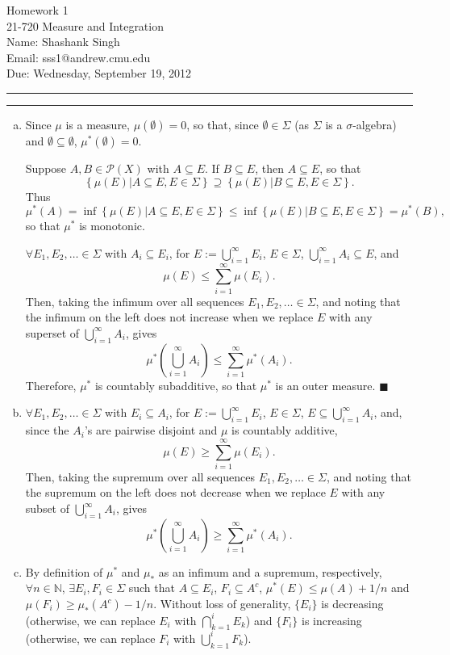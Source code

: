 \documentclass[11pt]{article}
\makeatletter
\newcounter{questionCounter}
\newcounter{partCounter}[questionCounter]
\newenvironment{question}[2][\arabic{questionCounter}]{%
    \setcounter{partCounter}{0}%
    \vspace{.25in} \hrule \vspace{0.5em}%
        \noindent{\bf #2}%
    \vspace{0.8em} \hrule \vspace{.10in}%
    \addtocounter{questionCounter}{1}%
}{}
\newcommand{\myname}{Shashank Singh}
\newcommand{\myandrew}{sss1@andrew.cmu.edu}
\newcommand{\myclass}{21-720 Measure and Integration}
\newcommand{\myhwnum}{1}
\newcommand{\duedate}{Wednesday, September 19, 2012}
\renewcommand{\qed}{\quad $\blacksquare$}
\newcommand{\N}{\mathbb{N}} %
\newcommand{\pow}[1]{\mathcal{P}\left(#1\right)} %
\makeatother
\begin{document}
\thispagestyle{plain}

{\Large Homework \myhwnum} \\
\myclass \\
Name: \myname \\
Email: \myandrew \\
Due: \duedate \\
\begin{question}{Problem 1}
\begin{enumerate}[(a)]
\item Since $\mu$ is a measure, $\mu(\emptyset) = 0$, so that, since
$\emptyset \in \Sigma$ (as $\Sigma$ is a $\sigma$-algebra) and
$\emptyset \subseteq \emptyset$, $\mu^*(\emptyset) = 0$.

Suppose $A,B \in \pow{X}$ with $A \subseteq E$. If $B \subseteq E$, then
$A \subseteq E$, so that
\[\left\{\mu(E) \right| \left. A \subseteq E, E \in \Sigma\right\}
\supseteq \left\{\mu(E) \right| \left. B \subseteq E, E \in \Sigma\right\}.\]
Thus
\[\mu^*(A)
 = \inf\left\{\mu(E) \right| \left. A \subseteq E, E \in \Sigma\right\}
\leq \inf\left\{\mu(E) \right| \left. B \subseteq E, E \in \Sigma\right\}
 = \mu^*(B),\]
so that $\mu^*$ is monotonic.

$\forall E_1,E_2,\ldots \in \Sigma$
with $A_i \subseteq E_i$, for $E := \bigcup_{i = 1}^{\infty} E_i$,
$E \in \Sigma$, $\bigcup_{i = 1}^{\infty} A_i \subseteq E$, and 
\[\mu(E) \leq \sum_{i = 1}^{\infty} \mu(E_i).\]
Then, taking the infimum over all sequences $E_1,E_2,\ldots \in \Sigma$, and
noting that the infimum on the left does not increase when we replace $E$
with any superset of $\bigcup_{i = 1}^{\infty} A_i$, gives
\[\mu^*\left( \bigcup_{i = 1}^{\infty} A_i \right)
 \leq \sum_{i = 1}^{\infty} \mu^*(A_i).\]
Therefore, $\mu^*$ is countably subadditive, so that $\mu^*$ is an outer
measure. \qed

\item $\forall E_1,E_2,\ldots \in\Sigma$
with $E_i \subseteq A_i$, for $E := \bigcup_{i = 1}^{\infty} E_i$,
$E \in \Sigma$, $E \subseteq \bigcup_{i = 1}^{\infty} A_i$, and, since
the $A_i$'s are pairwise disjoint and $\mu$ is countably additive,
\[\mu(E) \geq \sum_{i = 1}^{\infty} \mu(E_i).\]
Then, taking the supremum over all sequences $E_1,E_2,\ldots \in \Sigma$, and
noting that the supremum on the left does not decrease when we replace $E$
with any subset of $\bigcup_{i = 1}^{\infty} A_i$, gives
\[\mu^*\left( \bigcup_{i = 1}^{\infty} A_i \right)
 \geq \sum_{i = 1}^{\infty} \mu^*(A_i).\]


\item By definition of $\mu^*$ and $\mu_*$ as an infimum and a supremum,
respectively, $\forall n \in \N$, $\exists E_i, F_i \in \Sigma$ such that
$A \subseteq E_i$, $F_i \subseteq A^c$, $\mu^*(E) \leq \mu(A) + 1/n$ and
$\mu(F_i) \geq \mu_*(A^c)- 1/n$. Without loss of generality, $\{E_i\}$ is
decreasing (otherwise, we can replace $E_i$ with
$\bigcap_{k = 1}^i E_k$) and $\{F_i\}$ is increasing (otherwise, we can
replace $F_i$ with $\bigcup_{k = 1}^i F_k$).


\end{enumerate}
\end{question}
\end{document}
